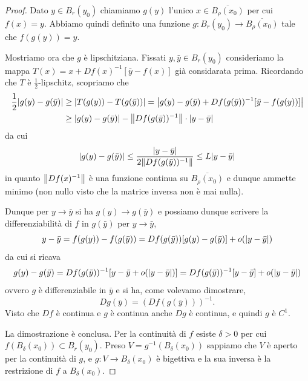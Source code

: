 \begin{proof}
Dato $y\in B_r(y_0)$ chiamiamo $g(y)$ l'unico $x\in \overline{B_\rho(x_0)}$
per cui $f(x)=y$. 
Abbiamo quindi definito una funzione $g\colon B_r(y_0) \to \overline{B_\rho(x_0)}$
tale che $f(g(y)) = y$.

Mostriamo ora che $g$ è lipschitziana. Fissati $y,\bar y \in B_r(y_0)$ 
consideriamo la mappa $T(x) = x + Df(x)^{-1}[\bar y - f(x)]$ già considarata prima.
Ricordando che $T$ è $\frac 1 2$-lipschitz, scopriamo che  
\begin{align*}
\frac 1 2 |g(y)-g(\bar y)| 
        &\ge |T(g(y))-T(g(\bar y))| 
        = {\left|g(y) - g(\bar y) + Df(g(\bar y))^{-1}[\bar y-f(g(y))]\right|}\\
        &\ge |g(y)-g(\bar y)| - {\left\Vert Df(g(\bar y))^{-1}\right\Vert}\cdot {\left|y - \bar y\right|}
\end{align*}
da cui
\[
        {\left|g(y) - g(\bar y)\right|} 
        \le \frac{{\left|y - \bar y\right|}}{2{\left\Vert  Df(g(\bar y))^{-1}\right\Vert}}
        \le L {\left|y - \bar y\right|}
\]
in quanto ${\left\Vert Df(x)^{-1}\right\Vert}$ è una funzione continua 
su $\overline{B_\rho(x_0)}$ e dunque ammette minimo (non nullo 
visto che la matrice inversa non è mai nulla).

Dunque per $y \to \bar y$ si ha $g(y) \to g(\bar y)$
e possiamo dunque scrivere la differenziabilità di $f$ in $g(\bar y)$
per $y\to \bar y$, 
\[
   y - \bar y = f(g(y)) - f(g(\bar y)) = Df(g(\bar y))[g(y) - g(\bar y)] + o({\left|y - \bar y\right|})
\]
da cui si ricava 
\[
  g(y) - g(\bar y) 
  = Df(g(\bar y))^{-1}[y - \bar y + o({\left|y-\bar y\right|})]
  = Df(g(\bar y))^{-1}[y - \bar y] + o({\left|y-\bar y\right|})
\]
ovvero $g$ è differenziabile in $\bar y$ e si ha,
come volevamo dimostrare, 
\[
  Dg(\bar y) = (Df(g(\bar y)))^{-1}.
\]
Visto che $Df$ è continua e $g$ è continua anche $Dg$ è continua,
e quindi $g$ è $C^1$.

La dimostrazione è conclusa. 
Per la continuità di $f$ esiste $\delta>0$ per cui $f(B_\delta(x_0)) \subset B_r(y_0)$.
Preso $V=g^{-1}(B_\delta(x_0))$ sappiamo che $V$ è aperto per la continuità
di $g$, e $g\colon V\to B_\delta(x_0)$ è bigettiva e la sua inversa
è la restrizione di $f$ a $B_\delta(x_0)$.
\end{proof}


